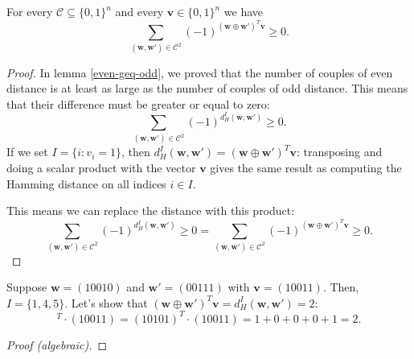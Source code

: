 \begin{lemma}
    For every $\mathcal{C} \subseteq \{0,1\}^n$ and every $\mathbf{v}\in\{0,1\}^n$ we have
    \begin{equation}
        \label{sum-almost-here}
        \sum_{(\mathbf{w}, \mathbf{w}')\in\mathcal{C}^2}(-1)^{(\textbf{w} \oplus \textbf{w}')^T\mathbf{v}} \geq 0.
    \end{equation}
    \begin{proof}
        In lemma \ref{even-geq-odd}, we proved that the number of couples of even distance is at least as large as the number of couples of odd distance. This means that their difference must be greater or equal to zero:
        \begin{equation}
            \label{evens-odd-geq-zero}
            \sum_{(\mathbf{w}, \mathbf{w}')\in\mathcal{C}^2}(-1)^{d_H^I(\mathbf{w}, \mathbf{w}')} \geq 0.
        \end{equation}
        If we set $I=\{i:v_i=1\}$, then $d_H^I(\mathbf{w}, \mathbf{w}') = (\textbf{w} \oplus \textbf{w}')^T\mathbf{v}$: transposing and doing a scalar product with the vector $\mathbf{v}$ gives the same result as computing the Hamming distance on all indices $i\in I$.

        This means we can replace the distance with this product:
        \begin{equation*}
            \sum_{(\mathbf{w}, \mathbf{w}')\in\mathcal{C}^2}(-1)^{d_H^I(\mathbf{w}, \mathbf{w}')} \geq 0
            =
            \sum_{(\mathbf{w}, \mathbf{w}')\in\mathcal{C}^2}(-1)^{(\textbf{w} \oplus \textbf{w}')^T\mathbf{v}} \geq 0.
        \end{equation*}
    \end{proof}
    \begin{example}
        Suppose $\mathbf{w}=(10010)$ and $\mathbf{w}'=(00111)$ with $\mathbf{v}=(10011)$.
        Then, $I = \{1,4,5\}$. Let's show that $(\textbf{w} \oplus \textbf{w}')^T\mathbf{v} = d_H^I(\mathbf{w}, \mathbf{w}') = 2$:
        \begin{equation*}
            [(10010) \oplus (00111)]^T \cdot (10011) = (10101)^T \cdot (10011) = 1+0+0+0+1 = 2.
        \end{equation*}
    \end{example}
        
    
    \begin{proof}[Proof (algebraic)]
    \end{proof}
\end{lemma}

